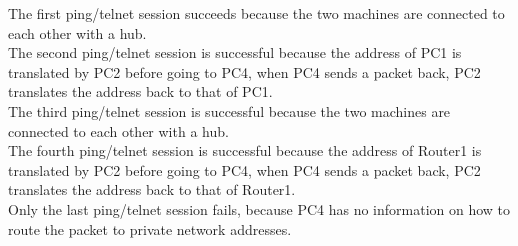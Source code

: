 The first ping/telnet session succeeds because the two machines are connected to each other with a hub. \\
The second ping/telnet session is successful because the address of PC1 is translated by PC2 before going to PC4, when PC4 sends a packet back, PC2 translates the address back to that of PC1. \\
The third ping/telnet session is successful because the two machines are connected to each other with a hub. \\
The fourth ping/telnet session is successful because the address of Router1 is translated by PC2 before going to PC4, when PC4 sends a packet back, PC2 translates the address back to that of Router1. \\
Only the last ping/telnet session fails, because PC4 has no information on how to route the packet to private network addresses.
